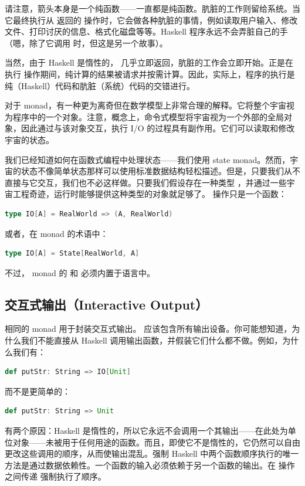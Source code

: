 请注意，箭头本身是一个纯函数——一直都是纯函数。肮脏的工作则留给系统。当它最终执行从  返回的  操作时，它会做各种肮脏的事情，例如读取用户输入、修改文件、打印讨厌的信息、格式化磁盘等等。Haskell 程序永远不会弄脏自己的手（嗯，除了它调用  时，但这是另一个故事）。

当然，由于 Haskell 是惰性的， 几乎立即返回，肮脏的工作会立即开始。正是在执行  操作期间，纯计算的结果被请求并按需计算。因此，实际上，程序的执行是纯（Haskell）代码和肮脏（系统）代码的交错进行。

对于  monad，有一种更为离奇但在数学模型上非常合理的解释。它将整个宇宙视为程序中的一个对象。注意，概念上，命令式模型将宇宙视为一个外部的全局对象，因此通过与该对象交互，执行 I/O 的过程具有副作用。它们可以读取和修改宇宙的状态。

我们已经知道如何在函数式编程中处理状态——我们使用 state monad。然而，宇宙的状态不像简单状态那样可以使用标准数据结构轻松描述。但是，只要我们从不直接与它交互，我们也不必这样做。只要我们假设存在一种类型 ，并通过一些宇宙工程奇迹，运行时能够提供这种类型的对象就足够了。 操作只是一个函数：

\begin{lstlisting}[language=Scala]
type IO[A] = RealWorld => (A, RealWorld)
\end{lstlisting}
或者，在  monad 的术语中：

\begin{lstlisting}[language=Scala]
type IO[A] = State[RealWorld, A]
\end{lstlisting}
不过， monad 的 \code{>=>} 和  必须内置于语言中。

\subsection{交互式输出（Interactive Output）}

相同的  monad 用于封装交互式输出。  应该包含所有输出设备。你可能想知道，为什么我们不能直接从 Haskell 调用输出函数，并假装它们什么都不做。例如，为什么我们有：

\begin{lstlisting}[language=Scala]
def putStr: String => IO[Unit]
\end{lstlisting}
而不是更简单的：

\begin{lstlisting}[language=Scala]
def putStr: String => Unit
\end{lstlisting}
有两个原因：Haskell 是惰性的，所以它永远不会调用一个其输出——在此处为单位对象——未被用于任何用途的函数。而且，即使它不是惰性的，它仍然可以自由更改这些调用的顺序，从而使输出混乱。强制 Haskell 中两个函数顺序执行的唯一方法是通过数据依赖性。一个函数的输入必须依赖于另一个函数的输出。在  操作之间传递  强制执行了顺序。

